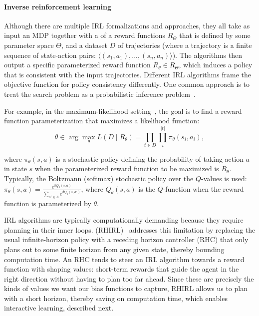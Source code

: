 
\paragraph{Inverse reinforcement learning}

Although there are multiple IRL formalizations and approaches, they
all take as input an MDP together with a  of a reward
functions $R_\Theta$ that is defined by some parameter space $\Theta$,
and a dataset $D$ of trajectories (where a trajectory is a finite
sequence of state-action pairs: $\langle (s_1, a_1), ..., (s_n, a_n)
\rangle$). The algorithms then output a specific parameterized reward
function $R_\theta \in R_\Theta$, which induces a policy that is
consistent with the input trajectories.
%
Different IRL algorithms frame the objective function for policy
consistency differently. One common approach is to treat the
search problem as a probabilistic inference
problem~\cite{babes11,lopes2009active,ramachandran2007bayesian,ziebart2008maximum}. 

For example, in the maximum-likelihood setting~\cite{babes11}, the
goal is to find a reward function parameterization that maximizes a
likelihood function:
%
\begin{equation}
\label{eq:mlirl}
\theta \in \arg\max_{\theta} L(D \mid R_{\theta}) = \prod_{t \in D} \prod_i^{|t|} \pi_{\theta}(s_i, a_i),
\end{equation}

where $\pi_{\theta}(s, a)$ is a stochastic policy defining the
probability of taking action $a$ in state $s$ when the parameterized
reward function to be maximized is $R_{\theta}$. Typically, the
Boltzmann (softmax) stochastic policy over the $Q$-values is used:
$\pi_{\theta}(s, a) = \frac{e^{\beta Q_{\theta}(s,a)}}{\sum_{a' \in A}
  e^{\beta Q_{\theta}(s,a')}}$, where $Q_\theta(s, a)$ is the $Q$-function
when the reward function is parameterized by $\theta$.




IRL algorithms are typically computationally demanding because they
require planning in their inner loops.
%
(RHIRL)~\cite{macglashan15b} addresses this limitation by replacing
the usual infinite-horizon policy with a receding horizon controller
(RHC) that only plans out to some finite horizon from any given state,
thereby bounding computation time. An RHC tends to steer an IRL
algorithm towards a reward function with shaping values: short-term
rewards that guide the agent in the right direction without having to
plan too far ahead. Since these are precisely the kinds of values we
want our bias functions to capture, RHIRL allows us to plan with a
short horizon, thereby saving on computation time, which enables
interactive learning, described next.

